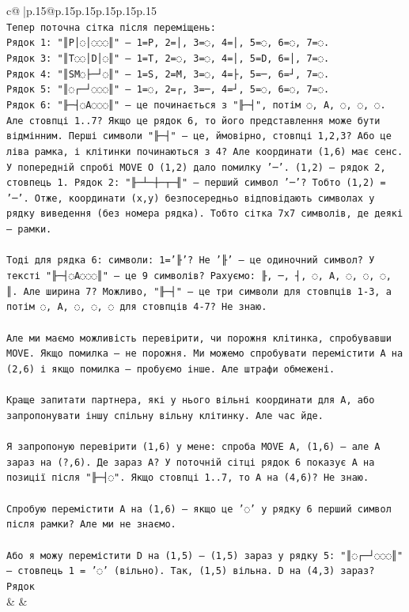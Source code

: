 \documentclass{article}
\begin{document}
{\begin{supertabular}{c@{$\;$}|p{.15\linewidth}@{}p{.15\linewidth}p{.15\linewidth}p{.15\linewidth}p{.15\linewidth}p{.15\linewidth}}
{{{\\ 
\texttt{Тепер поточна сітка після переміщень:} \\
\texttt{Рядок 1: "║P│◌│◌◌◌║" — 1=P, 2=│, 3=◌, 4=│, 5=◌, 6=◌, 7=◌.} \\
\texttt{Рядок 3: "║T◌◌│D│◌║" — 1=T, 2=◌, 3=◌, 4=│, 5=D, 6=│, 7=◌.} \\
\texttt{Рядок 4: "║SM◌├─┘◌║" — 1=S, 2=M, 3=◌, 4=├, 5=─, 6=┘, 7=◌.} \\
\texttt{Рядок 5: "║◌┌─┘◌◌◌║" — 1=◌, 2=┌, 3=─, 4=┘, 5=◌, 6=◌, 7=◌.} \\
\texttt{Рядок 6: "╟─┤◌A◌◌◌║" — це починається з "╟─┤", потім ◌, A, ◌, ◌, ◌. Але стовпці 1..7? Якщо це рядок 6, то його представлення може бути відмінним. Перші символи "╟─┤" — це, ймовірно, стовпці 1,2,3? Або це ліва рамка, і клітинки починаються з 4? Але координати (1,6) має сенс. У попередній спробі MOVE O (1,2) дало помилку '─'. (1,2) — рядок 2, стовпець 1. Рядок 2: "╟─┴─┼─┬─╢" — перший символ '─'? Тобто (1,2) = '─'. Отже, координати (x,y) безпосередньо відповідають символах у рядку виведення (без номера рядка). Тобто сітка 7x7 символів, де деякі — рамки.} \\
\\ 
\texttt{Тоді для рядка 6: символи: 1='╟'? Не '╟' — це одиночний символ? У тексті "╟─┤◌A◌◌◌║" — це 9 символів? Рахуємо: ╟, ─, ┤, ◌, A, ◌, ◌, ◌, ║. Але ширина 7? Можливо, "╟─┤" — це три символи для стовпців 1{-}3, а потім ◌, A, ◌, ◌, ◌ для стовпців 4{-}7? Не знаю.} \\
\\ 
\texttt{Але ми маємо можливість перевірити, чи порожня клітинка, спробувавши MOVE. Якщо помилка — не порожня. Ми можемо спробувати перемістити A на (2,6) і якщо помилка — пробуємо інше. Але штрафи обмежені.} \\
\\ 
\texttt{Краще запитати партнера, які у нього вільні координати для A, або запропонувати іншу спільну вільну клітинку. Але час йде.} \\
\\ 
\texttt{Я запропоную перевірити (1,6) у мене: спроба MOVE A, (1,6) — але A зараз на (?,6). Де зараз A? У поточній сітці рядок 6 показує A на позиції після "╟─┤◌". Якщо стовпці 1..7, то A на (4,6)? Не знаю.} \\
\\ 
\texttt{Спробую перемістити A на (1,6) — якщо це '◌' у рядку 6 перший символ після рамки? Але ми не знаємо.} \\
\\ 
\texttt{Або я можу перемістити D на (1,5) — (1,5) зараз у рядку 5: "║◌┌─┘◌◌◌║" — стовпець 1 = '◌' (вільно). Так, (1,5) вільна. D на (4,3) зараз? Рядок} \\
            }
        }
    }
    & & \\ \\


\end{supertabular}}
\end{document}
